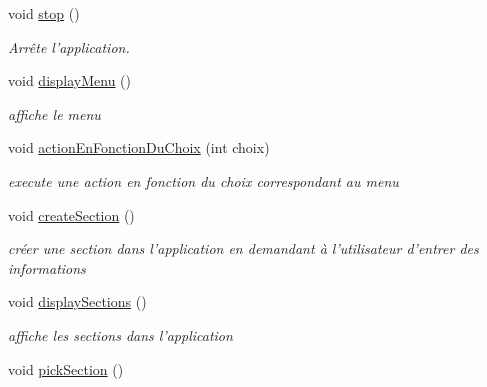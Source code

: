\begin{DoxyCompactItemize}
\item 
\hypertarget{class_application_a2e5dee1fbe413783d3500fe8da567ad4}{void \hyperlink{class_application_a2e5dee1fbe413783d3500fe8da567ad4}{stop} ()}\label{class_application_a2e5dee1fbe413783d3500fe8da567ad4}

\begin{DoxyCompactList}\small\item\em Arrête l'application. \end{DoxyCompactList}\item 
\hypertarget{class_application_add54e7e284193c33816a02cd7095a1f9}{void \hyperlink{class_application_add54e7e284193c33816a02cd7095a1f9}{display\-Menu} ()}\label{class_application_add54e7e284193c33816a02cd7095a1f9}

\begin{DoxyCompactList}\small\item\em affiche le menu \end{DoxyCompactList}\item 
void \hyperlink{class_application_a5ca4fe263fa30512c901e699f6c68bbf}{action\-En\-Fonction\-Du\-Choix} (int choix)
\begin{DoxyCompactList}\small\item\em execute une action en fonction du choix correspondant au menu \end{DoxyCompactList}\item 
\hypertarget{class_application_a0955ba50bcf6ea2046262e510cce397e}{void \hyperlink{class_application_a0955ba50bcf6ea2046262e510cce397e}{create\-Section} ()}\label{class_application_a0955ba50bcf6ea2046262e510cce397e}

\begin{DoxyCompactList}\small\item\em créer une section dans l'application en demandant à l'utilisateur d'entrer des informations \end{DoxyCompactList}\item 
\hypertarget{class_application_ac541cc1b3ecc5096252127243b8fc207}{void \hyperlink{class_application_ac541cc1b3ecc5096252127243b8fc207}{display\-Sections} ()}\label{class_application_ac541cc1b3ecc5096252127243b8fc207}

\begin{DoxyCompactList}\small\item\em affiche les sections dans l'application \end{DoxyCompactList}\item 
\hypertarget{class_application_a0e1159d250594e7a388bd031a1c845d3}{void \hyperlink{class_application_a0e1159d250594e7a388bd031a1c845d3}{pick\-Section} ()}\label{class_application_a0e1159d250594e7a388bd031a1c845d3}


\end{DoxyCompactItemize}
